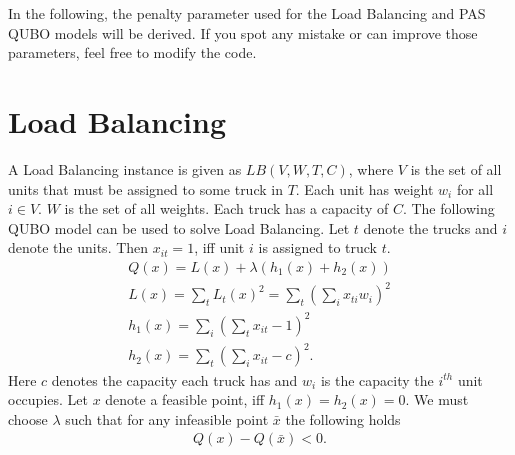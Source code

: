 \documentclass[12pt]{article}
\begin{document}
\noindent
In the following, the penalty parameter used for the Load Balancing and PAS QUBO models will be derived.
If you spot any mistake or can improve those parameters, feel free to modify the code.

\section{Load Balancing}
A Load Balancing instance is given as $LB(V, W, T, C)$, where $V$ is the set of all units that must be assigned to some  truck in $T$. 
Each unit has weight $w_i$ for all $i \in V$.
$W$ is the set of all weights.
Each truck has a capacity of $C$.
The following QUBO model can be used to solve Load Balancing.
Let $t$ denote the trucks and $i$ denote the units.
Then $x_{it} = 1$, iff unit $i$ is assigned to truck $t$.
\begin{gather}
Q(x) = L(x) + \lambda(h_1(x) + h_2(x))\\
L(x) = \sum_t L_t(x)^2 = \sum_t \left(\sum_{i} x_{ti}w_i\right)^2 \\
h_1(x) = \sum_i \left(\sum_t x_{it} - 1\right)^2 \\
h_2(x) = \sum_t \left(\sum_i x_{it} - c\right)^2.
\end{gather}
Here $c$ denotes the capacity each truck has and $w_i$ is the capacity the $i^{th}$ unit occupies.
Let $x$ denote a feasible point, iff $h_1(x) = h_2(x) = 0$.
We must choose $\lambda$ such that for any infeasible point $\bar{x}$ the following holds
\begin{gather}
Q(x) -  Q(\bar{x}) < 0.
\end{gather}
\end{document}

